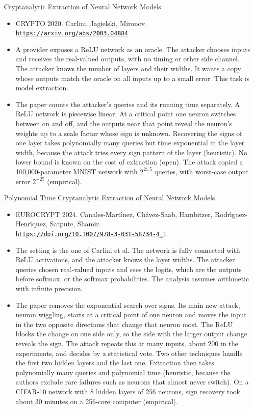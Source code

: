 \documentclass[aspectratio=169,10pt]{beamer}
\newcommand{\venue}[3]{\item #1. #2.\\ \href{#3}{\nolinkurl{#3}}}
\begin{document}
\begin{frame}{Cryptanalytic Extraction of Neural Network Models}
  \begin{itemize}
    \venue{CRYPTO 2020}{Carlini, Jagielski, Mironov}{https://arxiv.org/abs/2003.04884}
    \item A provider exposes a ReLU network as an oracle. The attacker chooses inputs and receives the real-valued outputs, with no timing or other side channel. The attacker knows the number of layers and their widths. It wants a copy whose outputs match the oracle on all inputs up to a small error. This task is model extraction.
    \item The paper counts the attacker's queries and its running time separately. A ReLU network is piecewise linear. At a critical point one neuron switches between on and off, and the outputs near that point reveal the neuron's weights up to a scale factor whose sign is unknown. Recovering the signs of one layer takes polynomially many queries but time exponential in the layer width, because the attack tries every sign pattern of the layer (heuristic). No lower bound is known on the cost of extraction (open). The attack copied a 100,000-parameter MNIST network with $2^{21.5}$ queries, with worst-case output error $2^{-25}$ (empirical).
  \end{itemize}
\end{frame}

\begin{frame}{Polynomial Time Cryptanalytic Extraction of Neural Network Models}
  \begin{itemize}
    \venue{EUROCRYPT 2024}{Canales-Mart\'{\i}nez, Ch\'avez-Saab, Hambitzer, Rodr\'{\i}guez-Henr\'{\i}quez, Satpute, Shamir}{https://doi.org/10.1007/978-3-031-58734-4_1}
    \item The setting is the one of Carlini et al. The network is fully connected with ReLU activations, and the attacker knows the layer widths. The attacker queries chosen real-valued inputs and sees the logits, which are the outputs before softmax, or the softmax probabilities. The analysis assumes arithmetic with infinite precision.
    \item The paper removes the exponential search over signs. Its main new attack, neuron wiggling, starts at a critical point of one neuron and moves the input in the two opposite directions that change that neuron most. The ReLU blocks the change on one side only, so the side with the larger output change reveals the sign. The attack repeats this at many inputs, about 200 in the experiments, and decides by a statistical vote. Two other techniques handle the first two hidden layers and the last one. Extraction then takes polynomially many queries and polynomial time (heuristic, because the authors exclude rare failures such as neurons that almost never switch). On a CIFAR-10 network with 8 hidden layers of 256 neurons, sign recovery took about 30 minutes on a 256-core computer (empirical).
  \end{itemize}
\end{frame}
\end{document}
